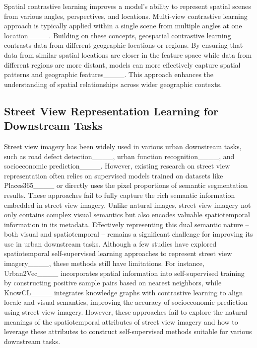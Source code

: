 Spatial contrastive learning improves a model's ability to represent spatial scenes from various angles, perspectives, and locations. Multi-view contrastive learning approach is typically applied within a single scene from multiple angles at one location____.
Building on these concepts, geospatial contrastive learning contrasts data from different geographic locations or regions. By ensuring that data from similar spatial locations are closer in the feature space while data from different regions are more distant, models can more effectively capture spatial patterns and geographic features____. This approach enhances the understanding of spatial relationships across wider geographic contexts.

\subsection{Street View Representation Learning for Downstream Tasks}
Street view imagery has been widely used in various urban downstream tasks, such as road defect detection____, urban function recognition____, and socioeconomic prediction____. However, existing research on street view representation often relies on supervised models trained on datasets like Places365____ or directly uses the pixel proportions of semantic segmentation results. These approaches fail to fully capture the rich semantic information embedded in street view imagery. Unlike natural images, street view imagery not only contains complex visual semantics but also encodes valuable spatiotemporal information in its metadata. Effectively representing this dual semantic nature -- both visual and spatiotemporal -- remains a significant challenge for improving its use in urban downstream tasks. Although a few studies have explored spatiotemporal self-supervised learning approaches to represent street view imagery____, these methods still have limitations. For instance, Urban2Vec____ incorporates spatial information into self-supervised training by constructing positive sample pairs based on nearest neighbors, while KnowCL____ integrates knowledge graphs with contrastive learning to align locale and visual semantics, improving the accuracy of socioeconomic prediction using street view imagery. However, these approaches fail to explore the natural meanings of the spatiotemporal attributes of street view imagery and how to leverage these attributes to construct self-supervised methods suitable for various downstream tasks.
